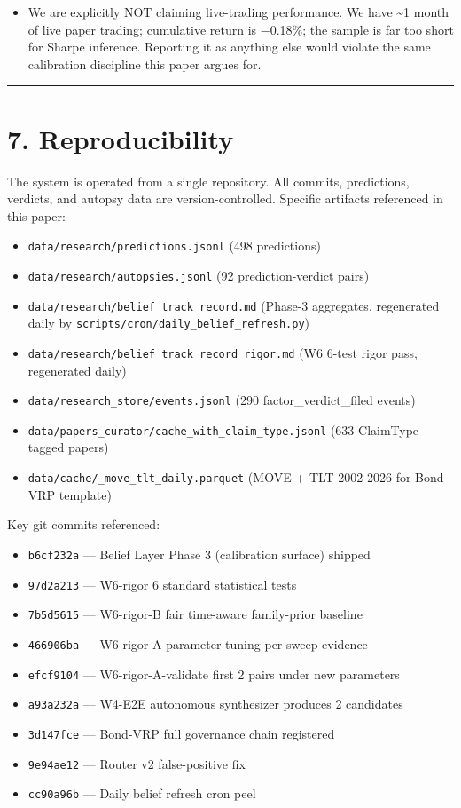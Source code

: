 \documentclass[11pt,a4paper]{article}
\begin{document}
\begin{itemize}[leftmargin=*]
\item We are explicitly NOT claiming live-trading performance. We have \textasciitilde{}1 month of live paper trading; cumulative return is −0.18\%; the sample is far too short for Sharpe inference. Reporting it as anything else would violate the same calibration discipline this paper argues for.
\end{itemize}

\medskip\hrule\medskip

\section{7. Reproducibility}

The system is operated from a single repository. All commits, predictions, verdicts, and autopsy data are version-controlled. Specific artifacts referenced in this paper:

\begin{itemize}[leftmargin=*]
\item \texttt{data/research/predictions.jsonl} (498 predictions)
\item \texttt{data/research/autopsies.jsonl} (92 prediction-verdict pairs)
\item \texttt{data/research/belief\_track\_record.md} (Phase-3 aggregates, regenerated daily by \texttt{scripts/cron/daily\_belief\_refresh.py})
\item \texttt{data/research/belief\_track\_record\_rigor.md} (W6 6-test rigor pass, regenerated daily)
\item \texttt{data/research\_store/events.jsonl} (290 factor\_verdict\_filed events)
\item \texttt{data/papers\_curator/cache\_with\_claim\_type.jsonl} (633 ClaimType-tagged papers)
\item \texttt{data/cache/\_move\_tlt\_daily.parquet} (MOVE + TLT 2002-2026 for Bond-VRP template)
\end{itemize}

Key git commits referenced:
\begin{itemize}[leftmargin=*]
\item \texttt{b6cf232a} — Belief Layer Phase 3 (calibration surface) shipped
\item \texttt{97d2a213} — W6-rigor 6 standard statistical tests
\item \texttt{7b5d5615} — W6-rigor-B fair time-aware family-prior baseline
\item \texttt{466906ba} — W6-rigor-A parameter tuning per sweep evidence
\item \texttt{efcf9104} — W6-rigor-A-validate first 2 pairs under new parameters
\item \texttt{a93a232a} — W4-E2E autonomous synthesizer produces 2 candidates
\item \texttt{3d147fce} — Bond-VRP full governance chain registered
\item \texttt{9e94ae12} — Router v2 false-positive fix
\item \texttt{cc90a96b} — Daily belief refresh cron peel
\end{itemize}
\end{document}

